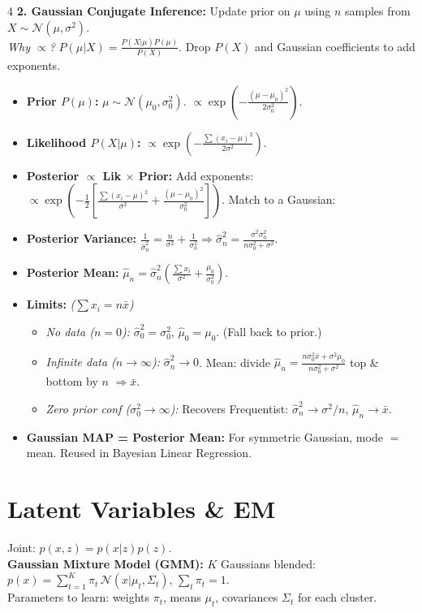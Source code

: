 \documentclass[9pt]{extarticle}
\begin{document}
\begin{multicols*}{4}
\textbf{2. Gaussian Conjugate Inference:}
Update prior on $\mu$ using $n$ samples from $X \sim \mathcal{N}(\mu, \sigma^2)$.\\
\textit{Why $\propto$?} $P(\mu|X) = \frac{P(X|\mu)P(\mu)}{P(X)}$. Drop $P(X)$ and Gaussian coefficients to add exponents.
\begin{itemize}
    \item \textbf{Prior $P(\mu)$:} $\mu \sim \mathcal{N}(\mu_0, \sigma_0^2)$. $\propto \exp\!\left(-\frac{(\mu - \mu_0)^2}{2\sigma_0^2}\right)$.
    \item \textbf{Likelihood $P(X|\mu)$:} $\propto \exp\!\left(-\frac{\sum(x_i - \mu)^2}{2\sigma^2}\right)$.
    \item \textbf{Posterior $\propto$ Lik $\times$ Prior:} Add exponents:
    $\propto \exp\!\left(-\frac{1}{2}\left[\frac{\sum(x_i - \mu)^2}{\sigma^2} + \frac{(\mu - \mu_0)^2}{\sigma_0^2}\right]\right)$. Match to a Gaussian:
    \item \textbf{Posterior Variance:} $\frac{1}{\hat{\sigma}_n^2} = \frac{n}{\sigma^2} + \frac{1}{\sigma_0^2} \Rightarrow \hat{\sigma}_n^2 = \frac{\sigma^2\sigma_0^2}{n\sigma_0^2 + \sigma^2}$.
    \item \textbf{Posterior Mean:} $\hat{\mu}_n = \hat{\sigma}_n^2(\frac{\sum x_i}{\sigma^2} + \frac{\mu_0}{\sigma_0^2})$.
    \item \textbf{Limits:} \textit{($\sum x_i = n\bar{x}$)}
    \begin{itemize}
        \item \textit{No data ($n=0$):} $\hat{\sigma}_0^2 = \sigma_0^2$, $\hat{\mu}_0 = \mu_0$. (Fall back to prior.)
        \item \textit{Infinite data ($n\to\infty$):} $\hat{\sigma}_n^2 \to 0$. Mean: divide $\hat{\mu}_n = \frac{n\sigma_0^2\bar{x} + \sigma^2\mu_0}{n\sigma_0^2 + \sigma^2}$ top \& bottom by $n$ $\Rightarrow \bar{x}$.
        \item \textit{Zero prior conf ($\sigma_0^2 \to \infty$):} Recovers Frequentist: $\hat{\sigma}_n^2 \to \sigma^2/n$, $\hat{\mu}_n \to \bar{x}$.
    \end{itemize}
    \item \textbf{Gaussian MAP = Posterior Mean:} For symmetric Gaussian, mode $=$ mean. Reused in Bayesian Linear Regression.
\end{itemize}
 
\section*{Latent Variables \& EM}
Joint: $p(x,z) = p(x|z)p(z)$.\\ 
\textbf{Gaussian Mixture Model (GMM):} $K$ Gaussians blended:
$p(x) = \sum_{t=1}^K \pi_t\, \mathcal{N}(x|\mu_t, \Sigma_t)$, $\sum_t \pi_t = 1$.\\
Parameters to learn: weights $\pi_t$, means $\mu_t$, covariances $\Sigma_t$ for each cluster.
 

\end{multicols*}
\end{document}
